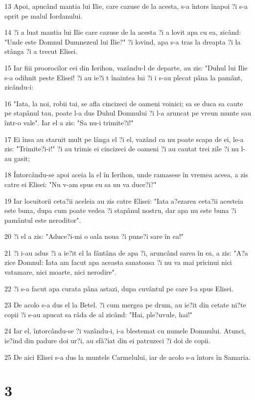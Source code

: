 \par 13 Apoi, apucând mantia lui Ilie, care cazuse de la acesta, s-a întors înapoi ?i s-a oprit pe malul Iordanului.
\par 14 ?i a luat mantia lui Ilie care cazuse de la acesta ?i a lovit apa cu ea, zicând: "Unde este Domnul Dumnezeul lui Ilie?" ?i lovind, apa s-a tras la dreapta ?i la stânga ?i a trecut Elisei.
\par 15 Iar fiii proorocilor cei din Ierihon, vazându-l de departe, au zis: "Duhul lui Ilie s-a odihnit peste Elisei! ?i au ie?i t înaintea lui ?i i s-au plecat pâna la pamânt, zicându-i:
\par 16 "Iata, la noi, robii tai, se afla cincizeci de oameni voinici; sa se duca sa caute pe stapânul tau, poate l-a dus Duhul Domnului ?i l-a aruncat pe vreun munte sau într-o vale". Iar el a zis: "Sa nu-i trimite?i!"
\par 17 Ei însa au staruit mult pe lânga el ?i el, vazând ca nu poate scapa de ei, le-a zis: "Trimite?i-i!" ?i au trimis ei cincizeci de oameni ?i au cautat trei zile ?i nu l-au gasit;
\par 18 Întorcându-se apoi aceia la el în Ierihon, unde ramasese în vremea aceea, a zis catre ei Elisei: "Nu v-am spus eu sa nu va duce?i?"
\par 19 Iar locuitorii ceta?ii aceleia au zis catre Elisei: "Iata a?ezarea ceta?ii acesteia este buna, dupa cum poate vedea ?i stapânul nostru, dar apa nu este buna ?i pamântul este neroditor".
\par 20 ?i el a zis: "Aduce?i-mi o oala noua ?i pune?i sare în ea!"
\par 21 ?i i-au adus ?i a ie?it el la fântâna de apa ?i, aruncând sarea în ea, a zis: "A?a zice Domnul: Iata am facut apa aceasta sanatoasa ?i nu va mai pricinui nici vatamare, nici moarte, nici nerodire".
\par 22 ?i s-a facut apa curata pâna astazi, dupa cuvântul pe care l-a spus Elisei.
\par 23 De acolo s-a dus el la Betel. ?i cum mergea pe drum, au ie?it din cetate ni?te copii ?i s-au apucat sa râda de al zicând: "Hai, ple?uvule, hai!"
\par 24 Iar el, întorcându-se ?i vazându-i, i-a blestemat cu numele Domnului. Atunci, ie?ind din padure doi ur?i, au sfâ?iat din ei patruzeci ?i doi de copii.
\par 25 De aici Elisei s-a dus la muntele Carmelului, iar de acolo s-a întors în Samaria.

\chapter{3}

